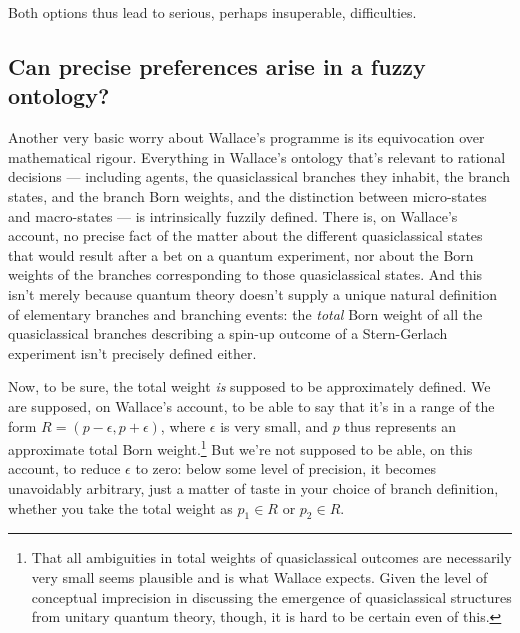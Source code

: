 \documentclass[aps,
pra,epsfig]{revtex4}
\begin{document}
Both options thus lead to serious, perhaps  
insuperable, difficulties. 

\subsection{Can precise preferences arise in a fuzzy ontology?}

Another very basic worry about Wallace's programme is its 
equivocation over mathematical rigour. 
Everything in Wallace's ontology that's 
relevant to rational decisions --- including agents, 
the quasiclassical branches they inhabit, the branch states, 
and the branch Born weights, and the distinction between micro-states
and macro-states --- is intrinsically fuzzily defined\cite{wallacevolone}.   
There is,
on Wallace's account, no precise fact of the matter about the 
different quasiclassical states that would result after a bet
on a quantum experiment, nor about the Born weights of the branches
corresponding to those quasiclassical states.   And this isn't merely
because quantum theory doesn't supply a unique natural definition of 
elementary branches and branching events: the {\it total} Born 
weight of all the quasiclassical branches describing a spin-up
outcome of a Stern-Gerlach experiment isn't precisely defined either. 

Now, to be sure, the total weight {\it is} supposed to 
be approximately defined.  We are supposed, on Wallace's
account, to be able to say that it's in a range of the 
form $ R = ( p - \epsilon, p + \epsilon )$, where $\epsilon$ is 
very small, and $p$ thus 
represents an approximate total Born weight.\footnote{That
all ambiguities in total weights of quasiclassical outcomes 
are necessarily very small seems plausible and is what Wallace expects.  
Given the level of conceptual imprecision in discussing the emergence
of quasiclassical structures from unitary quantum theory, 
though, it is hard to be certain even of this.}
But we're not supposed to be able, on
this account, to reduce $\epsilon$ to zero: below some level 
of precision, it becomes unavoidably arbitrary, just a matter of taste 
in your choice of branch definition, whether you take  
the total weight as $p_1 \in R$ or $p_2 \in R$. 
\end{document}
